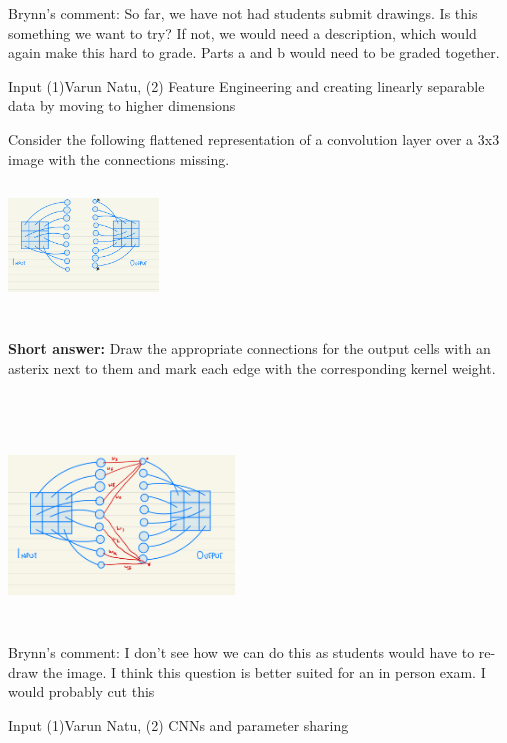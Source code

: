 \begin{questions}
\begin{parts}
\begin{soln}
    Brynn's comment: So far, we have not had students submit drawings. Is this something we want to try? If not, we would need a description, which would again make this hard to grade. Parts a and b would need to be graded together. 
    \end{soln}
    \end{parts}
    \addpoints
    \begin{qauthor}
    Input (1)Varun Natu, (2) Feature Engineering and creating linearly separable data by moving to higher dimensions
    \end{qauthor}
    
    
\question[3] Consider the following flattened representation of a convolution layer over a 3x3 image with the connections missing.
    \\ \includegraphics[width=4cm,height=4cm]{figures/CNN_flat.jpeg}

    \textbf{Short answer:} Draw the appropriate connections for the output cells with an asterix next to them and mark each edge with the corresponding kernel weight.
    \begin{soln}
    \\\includegraphics[width=6cm,height=6cm]{figures/CNN_Solution.jpeg}\\
    Brynn's comment: I don't see how we can do this as students would have to re-draw the image. I think this question is better suited for an in person exam. I would probably cut this
    \end{soln}
    \begin{qauthor}
    Input (1)Varun Natu, (2) CNNs and parameter sharing
    \end{qauthor}
    

\end{questions}
